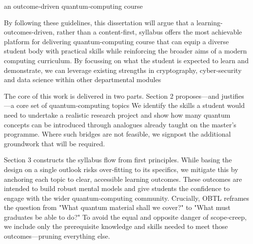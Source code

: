 an outcome‑driven quantum‑computing course

By following these guidelines, this dissertation will argue that a learning-outcomes-driven, rather than a content-first, syllabus 
offers the most achievable platform for delivering quantum-computing course 
that can equip a diverse student body with practical skills while reinforcing the broader aims of a modern computing curriculum. 
By focussing on what the student is expected to learn and demonstrate, we can leverage existing strengths 
in cryptography, cyber‑security and data science within other departmental modules
 
The core of this work is delivered in two parts.  
Section 2 proposes—and justifies—a core set of quantum‑computing topics
We identify the skills a student would need to undertake a realistic research project 
and show how many quantum concepts can be introduced through analogues already taught on the master’s programme.
Where such bridges are not feasible, we signpost the additional groundwork that will be required.


Section 3 constructs the syllabus flow from first principles. 
While basing the design on a single outlook risks over‑fitting to its specifics, 
we mitigate this by anchoring each topic to clear, accessible learning outcomes.
These outcomes are intended to build robust mental models and give students the confidence to engage with the wider quantum‑computing community. 
Crucially, OBTL reframes the question from "What quantum material shall we cover?" to "What must graduates be able to do?"
To avoid the equal and opposite danger of scope‑creep, we include only the prerequisite knowledge and skills needed to meet those outcomes—pruning everything else.


